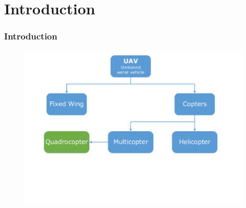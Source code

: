 \section{Introduction}

\begin{frame}
\frametitle{Introduction}
\begin{figure}[H]
  \begin{center}
  \includegraphics[scale=0.4]{fig/uav_groups.pdf}
  \end{center}
\end{figure}


\end{frame}




